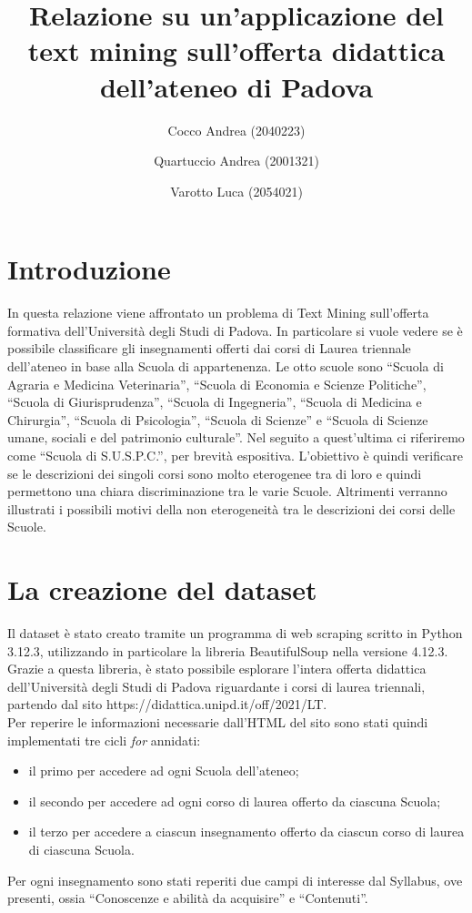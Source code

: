 \documentclass[10pt,a4paper,twoside]{tau-book}
\title{Relazione su un'applicazione del text mining sull'offerta didattica dell'ateneo di Padova}
\author{Cocco Andrea (2040223)} \author{Quartuccio Andrea (2001321)} \author{Varotto Luca (2054021)}
\affil{Corso di Laurea in Statistica per le Tecnologie e le Scienze - Esame di Metodi Statistici per i Big Data}
\begin{document}
	
\maketitle

\section{Introduzione}

In questa relazione viene affrontato un problema di Text Mining sull'offerta formativa dell’Università degli Studi di Padova. In particolare si vuole vedere se è possibile classificare gli insegnamenti offerti dai corsi di Laurea triennale dell’ateneo in base alla Scuola di appartenenza. Le otto scuole sono “Scuola di Agraria e Medicina Veterinaria”, “Scuola di Economia e Scienze Politiche”, “Scuola di Giurisprudenza”, “Scuola di Ingegneria”, “Scuola di Medicina e Chirurgia”, “Scuola di Psicologia”, “Scuola di Scienze” e “Scuola di Scienze umane, sociali e del patrimonio culturale”. Nel seguito a quest’ultima ci riferiremo come “Scuola di S.U.S.P.C.”, per brevità espositiva. L'obiettivo è quindi verificare se le descrizioni dei singoli corsi sono molto eterogenee tra di loro e quindi permettono una chiara discriminazione tra le varie Scuole. Altrimenti verranno illustrati i possibili motivi della non eterogeneità tra le descrizioni dei corsi delle Scuole.

\section{La creazione del dataset}

Il dataset è stato creato tramite un programma di web scraping scritto in Python 3.12.3, utilizzando in particolare la libreria BeautifulSoup nella versione 4.12.3. Grazie a questa libreria, è stato possibile esplorare l'intera offerta didattica dell'Università degli Studi di Padova riguardante i corsi di laurea triennali, partendo dal sito https://didattica.unipd.it/off/2021/LT. \\ Per reperire le informazioni necessarie dall'HTML del sito sono stati quindi implementati tre cicli \textit{for} annidati:
\begin{itemize}
    \item il primo per accedere ad ogni Scuola dell'ateneo;
    \item il secondo per accedere ad ogni corso di laurea offerto da ciascuna Scuola;
    \item il terzo per accedere a ciascun insegnamento offerto da ciascun corso di laurea di ciascuna Scuola.
\end{itemize}
Per ogni insegnamento sono stati reperiti due campi di interesse dal Syllabus, ove presenti, ossia “Conoscenze e abilità da acquisire” e “Contenuti”.
\end{document}
